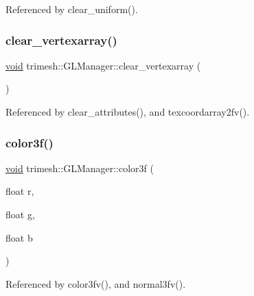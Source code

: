 Referenced by clear\+\_\+uniform().

\mbox{\label{classtrimesh_1_1GLManager_a6a6153cdc30b0bf920924cf59aa0d39e}} 
\subsubsection{\texorpdfstring{clear\+\_\+vertexarray()}{clear\_vertexarray()}}
{\footnotesize\ttfamily \hyperlink{namespacetrimesh_a784ddfd979e1c579bda795a8edfc3f43}{void} trimesh\+::\+G\+L\+Manager\+::clear\+\_\+vertexarray (\begin{DoxyParamCaption}{ }\end{DoxyParamCaption})}



Referenced by clear\+\_\+attributes(), and texcoordarray2fv().

\mbox{\label{classtrimesh_1_1GLManager_a5fe3cbf838dee50404bb5c759a16b417}} 
\subsubsection{\texorpdfstring{color3f()}{color3f()}}
{\footnotesize\ttfamily \hyperlink{namespacetrimesh_a784ddfd979e1c579bda795a8edfc3f43}{void} trimesh\+::\+G\+L\+Manager\+::color3f (\begin{DoxyParamCaption}\item[{float}]{r,  }\item[{float}]{g,  }\item[{float}]{b }\end{DoxyParamCaption})}



Referenced by color3fv(), and normal3fv().

\mbox{\label{classtrimesh_1_1GLManager_a79a090d35f5bde5c4a62669ae0db4aa6}} 
